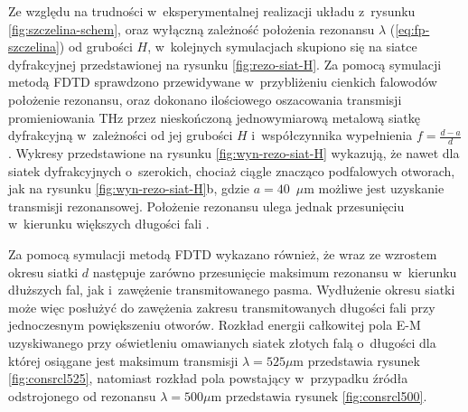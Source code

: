 Ze względu na trudności w~eksperymentalnej realizacji układu z~rysunku \ref{fig:szczelina-schem}, oraz wyłączną zależność położenia rezonansu $\lambda$ (\ref{eq:fp-szczelina}) od grubości $H$, w~kolejnych symulacjach skupiono się na siatce dyfrakcyjnej przedstawionej na rysunku \ref{fig:rezo-siat-H}.  Za pomocą symulacji metodą FDTD sprawdzono przewidywane w~przybliżeniu cienkich falowodów położenie rezonansu, oraz dokonano ilościowego oszacowania transmisji promieniowania THz przez nieskończoną jednowymiarową metalową siatkę dyfrakcyjną w~zależności od jej grubości $H$ i~współczynnika wypełnienia $f=\frac{d-a}{d}$. Wykresy przedstawione na rysunku \ref{fig:wyn-rezo-siat-H} wykazują, że nawet dla siatek dyfrakcyjnych o~szerokich, chociaż ciągle znacząco podfalowych otworach, jak na rysunku \ref{fig:wyn-rezo-siat-H}b, gdzie $a=40$~$\mu$m możliwe jest uzyskanie transmisji rezonansowej. Położenie rezonansu ulega jednak przesunięciu w~kierunku większych długości fali \cite{Szczytko2012271}.

Za pomocą symulacji metodą FDTD wykazano również, że wraz ze wzrostem okresu siatki $d$ następuje zarówno przesunięcie maksimum rezonansu w~kierunku dłuższych fal, jak i~zawężenie transmitowanego pasma. Wydłużenie okresu siatki może więc posłużyć do zawężenia zakresu transmitowanych długości fali przy jednoczesnym powiększeniu otworów. Rozkład energii całkowitej pola E-M uzyskiwanego przy oświetleniu omawianych siatek złotych falą o~długości dla której osiągane jest maksimum transmisji $\lambda=525 \mu$m przedstawia rysunek \ref{fig:consrcl525}, natomiast rozkład pola powstający w~przypadku źródła odstrojonego od rezonansu $\lambda=500\mu$m przedstawia rysunek \ref{fig:consrcl500}.

